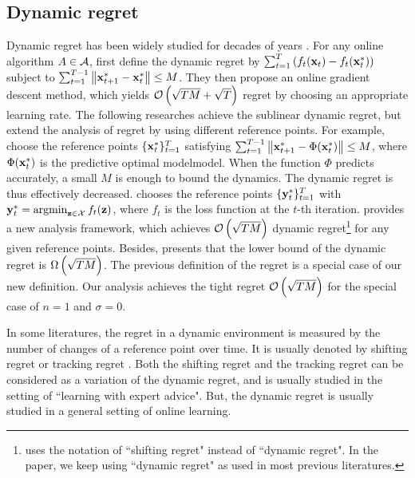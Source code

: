\documentclass{article}
\begin{document}
\subsection{Dynamic regret}

Dynamic regret has been widely studied for decades of years \citep{Zinkevich:2003,Hall:2015ct,Hall:2013vr,Jadbabaie:2015wg,Yang:2016ud,Bedi:2018te,Zhang:2016wl,Mokhtari:2016jz,Zhang:2018tu,Gyorgy:2016,NIPS2016_6536,Zhao:2018wx}.   For any online algorithm $A\in{\mathcal{A}}$, \citet{Zinkevich:2003} first define the dynamic regret by $\sum_{t=1}^T \left(  f_{t}({\bf x}_{t}) - f_{t}({\bf x}_t^\ast)  \right)$ subject to $\sum_{t=1}^{T-1} \left\lVert{\bf x}_{t+1}^\ast - {\bf x}_t^\ast\right\rVert \le M$. They then propose an online gradient descent method, which yields ${\mathcal{O}\left( \sqrt{TM}+\sqrt{T} \right)}$ regret by choosing an appropriate learning rate. The following researches achieve the sublinear dynamic regret, but extend the analysis of regret by using different reference points. For example, \citet{Hall:2015ct,Hall:2013vr} choose the reference points $\{{\bf x}_t^{\ast}\}_{t=1}^T$ satisfying $\sum_{t=1}^{T-1} \left\lVert{\bf x}_{t+1}^\ast - \Phi({\bf x}_t^\ast)\right\rVert \le M$, where $\Phi({\bf x}_t^\ast)$ is the predictive optimal modelmodel. When the function $\Phi$ predicts accurately, a small $M$ is enough to bound the dynamics. The dynamic regret is thus effectively decreased. \citet{Jadbabaie:2015wg,Yang:2016ud,Bedi:2018te,Zhang:2016wl,Mokhtari:2016jz,Zhang:2018tu} chooses the reference points $\{{\bf y}_t^{\ast}\}_{t=1}^T$ with $\y_t^{\ast} = \argmin_{\z\in\Xcal} f_t(\z)$, where $f_t$ is the loss function at the $t$-th iteration. \citet{Gyorgy:2016} provides a new analysis framework, which achieves ${\mathcal{O}\left( \sqrt{TM} \right)}$ dynamic regret\footnote{\citet{Gyorgy:2016} uses the notation of ``shifting regret" instead of ``dynamic regret". In the paper, we keep using ``dynamic regret" as used in most previous literatures. } for any given reference points. Besides, \citet{Zhao:2018wx} presents that the lower bound of the dynamic regret is $\Omega\left( \sqrt{TM} \right)$. The previous definition of the regret  is a special case of our new definition. Our analysis achieves the tight regret ${\mathcal{O}\left( \sqrt{TM} \right)}$ for the special case of $n=1$ and $\sigma = 0$. 

In some literatures, the regret in a dynamic environment is measured by the number of changes of a reference point over time. It is usually denoted by shifting regret or tracking regret \citep{Herbster1998,Gyorgy:2005wo,Gyorgy:2012wa,Gyorgy:2016,Mourtada:2017vn,JMLR:v17:13-533,NIPS2016_6536,cesabianchi:hal,pmlr-v84-mohri18a,pmlr-v54-jun17a}. Both the shifting regret and the tracking regret can be considered as a variation of the dynamic regret, and is usually studied in the setting of ``learning with expert advice". But, the dynamic regret is usually studied in a general setting of online learning.
\end{document}
